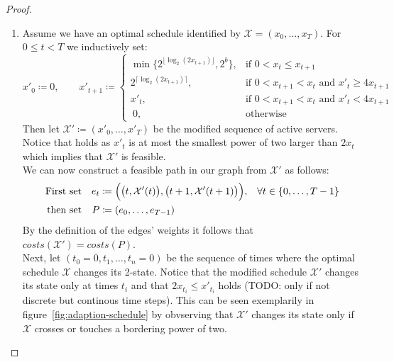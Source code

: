 \documentclass[hidelinks]{article}
\theoremstyle{plain}
\theoremstyle{definition}
\theoremstyle{rem}
\newcommand{\mx}{\mathcal{X}}
\newcommand{\fromto}[2]{\{#1,\ldots,#2\}}
\begin{document}
\begin{proof}
$ $
\begin{enumerate}
	\item Assume we have an optimal schedule identified by $\mx=(x_0,\ldots,x_T)$. For $0\le t<T$ we inductively set:
\begin{equation}
	x'_0\coloneqq 0,\qquad
	x'_{t+1}\coloneqq 
	\begin{cases}
		\min\bigl\{2^{\lfloor \log_2(2x_{t+1})\rfloor},2^b\bigr\}, & \text{if $0<x_t\le x_{t+1}$}\\
		2^{\lceil \log_2(2x_{t+1})\rceil}, & \text{if $0<x_{t+1}<x_t$ and $x'_{t}\ge4x_{t+1}$}\\
		x'_t, & \text{if $0<x_{t+1}<x_t$ and $x'_{t}<4x_{t+1}$}\\
		\		   0, & \text{otherwise}
	\end{cases} \label{def:chi_prime}
\end{equation}
Then let $\mx'\coloneqq(x'_0,\ldots,x'_T)$ be the modified sequence of active servers. Notice that  holds as $x'_t$ is at most the smallest power of two larger than $2x_t$ which implies that $\mx'$ is feasible.\\
We can now construct a feasible path in our graph from $\mathcal{X'}$ as follows:
\begin{align*}
	\text{First set}&&e_t&\coloneqq\Bigl(\bigl(t,\mx'(t)\bigr),\bigl(t+1,\mx'(t+1)\bigr)\Bigr),&\forall t\in\fromto{0}{T-1}\\
	\text{then set}&&P&\coloneqq(e_0,\ldots,e_{T-1})
\end{align*}
By the definition of the edges' weights it follows that $costs(\mx')=costs(P)$.\\
Next, let $(t_0=0,t_1,\ldots,t_n=0)$ be the sequence of times where the optimal schedule $\mx$ changes its 2-state. Notice that the modified schedule $\mx'$ changes its state only at times $t_i$ and that $2x_{t_i}\le x'_{t_i}$ holds (TODO: only if not discrete but continous time steps). This can be seen exemplarily in figure~\ref{fig:adaption-schedule} by obvserving that $\mx'$ changes its state only if $\mx$ crosses or touches a bordering power of two.
\begin{figure}[H]
\centering
\scalebox{0.7}{
\subfloat{
\begin{tikzpicture}
	\begin{axis}[%
	    ,xlabel=$t$
	    ,axis x line = bottom,axis y line = left
	    ,ytick={1,2,4,8,16}
	    ,ymax=17 %
	    ,xmax=9.9
	    ,legend pos=outer north east
	    ]

\end{axis}
\end{tikzpicture}}}
\end{figure}
\end{enumerate}
\end{proof}
\end{document}
